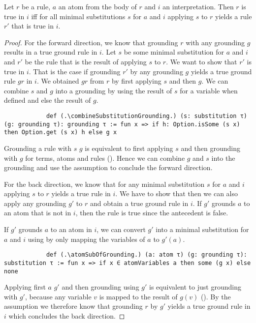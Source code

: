     \begin{lemma}[\replaceGroundingWithSubstitutionAndGrounding]
        Let $r$ be a rule, $a$ an atom from the body of $r$ and $i$ an interpretation. Then $r$ is true in $i$ iff for all minimal substitutions $s$ for $a$ and $i$ applying $s$ to $r$ yields a rule $r'$ that is true in $i$. 
    \end{lemma}
    \begin{proof}
        For the forward direction, we know that grounding $r$ with any grounding $g$ results in a true ground rule in $i$. Let $s$ be some minimal substitution for $a$ and $i$ and $r'$ be the rule that is the result of applying $s$ to $r$. We want to show that $r'$ is true in $i$. That is the case if grounding $r'$ by any grounding $g$ yields a true ground rule $gr$ in $i$. We obtained $gr$ from $r$ by first applying $s$ and then $g$. We can combine $s$ and $g$ into a grounding by using the result of $s$ for a variable when defined and else the result of $g$.

        \begin{lstlisting}
            def (.\combineSubstitutionGrounding.) (s: substitution τ) (g: grounding τ): grounding τ := fun x => if h: Option.isSome (s x) then Option.get (s x) h else g x
        \end{lstlisting}

        Grounding a rule with \combineSubstitutionGrounding $s$ $g$ is equivalent to first applying $s$ and then grounding with $g$ for terms, atoms and rules (\combineSubstitutionGroundingEquivRule). Hence we can combine $g$ and $s$ into the grounding \combineSubstitutionGrounding and use the assumption to conclude the forward direction.

        For the back direction, we know that for any minimal substitution $s$ for $a$ and $i$ applying $s$ to $r$ yields a true rule in $i$. We have to show that then we can also apply any grounding $g'$ to $r$ and obtain a true ground rule in $i$. If $g'$ grounds $a$ to an atom that is not in $i$, then the rule is true since the antecedent is false.

        If $g'$ grounds $a$ to an atom in $i$, we can convert $g'$ into a minimal substitution for $a$ and $i$ using \atomSubOfGrounding by only mapping the variables of $a$ to $g'(a)$.

        \begin{lstlisting}
            def (.\atomSubOfGrounding.) (a: atom τ) (g: grounding τ): substitution τ := fun x => if x ∈ atomVariables a then some (g x) else none
        \end{lstlisting}

        Applying first \atomSubOfGrounding $a$ $g'$ and then grounding using $g'$ is equivalent to just grounding with $g'$, because any variable $v$ is mapped to the result of $g(v)$
        (\atomSubOfGroundingGroundingEqGroundingOnRule). By the assumption we therefore know that grounding $r$ by $g'$ yields a true ground rule in $i$ which concludes the back direction.
    \end{proof}

